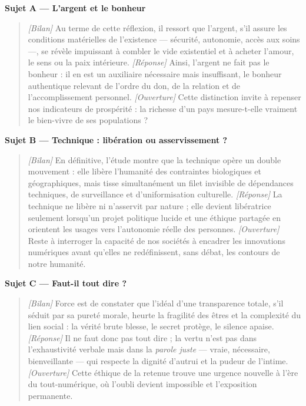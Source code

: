 \documentclass[11pt]{article}
\begin{document}
\begin{corrige}
\textbf{Sujet A — L'argent et le bonheur}
\begin{quote}
\textit{[Bilan]} Au terme de cette réflexion, il ressort que l'argent, s'il assure les conditions matérielles de l'existence — sécurité, autonomie, accès aux soins —, se révèle impuissant à combler le vide existentiel et à acheter l'amour, le sens ou la paix intérieure. \textit{[Réponse]} Ainsi, l'argent ne fait pas le bonheur : il en est un auxiliaire nécessaire mais insuffisant, le bonheur authentique relevant de l'ordre du don, de la relation et de l'accomplissement personnel. \textit{[Ouverture]} Cette distinction invite à repenser nos indicateurs de prospérité : la richesse d'un pays mesure-t-elle vraiment le bien-vivre de ses populations ?
\end{quote}

\textbf{Sujet B — Technique : libération ou asservissement ?}
\begin{quote}
\textit{[Bilan]} En définitive, l'étude montre que la technique opère un double mouvement : elle libère l'humanité des contraintes biologiques et géographiques, mais tisse simultanément un filet invisible de dépendances techniques, de surveillance et d'uniformisation culturelle. \textit{[Réponse]} La technique ne libère ni n'asservit par nature ; elle devient libératrice seulement lorsqu'un projet politique lucide et une éthique partagée en orientent les usages vers l'autonomie réelle des personnes. \textit{[Ouverture]} Reste à interroger la capacité de nos sociétés à encadrer les innovations numériques avant qu'elles ne redéfinissent, sans débat, les contours de notre humanité.
\end{quote}

\textbf{Sujet C — Faut-il tout dire ?}
\begin{quote}
\textit{[Bilan]} Force est de constater que l'idéal d'une transparence totale, s'il séduit par sa pureté morale, heurte la fragilité des êtres et la complexité du lien social : la vérité brute blesse, le secret protège, le silence apaise. \textit{[Réponse]} Il ne faut donc pas tout dire ; la vertu n'est pas dans l'exhaustivité verbale mais dans la \emph{parole juste} — vraie, nécessaire, bienveillante — qui respecte la dignité d'autrui et la pudeur de l'intime. \textit{[Ouverture]} Cette éthique de la retenue trouve une urgence nouvelle à l'ère du tout-numérique, où l'oubli devient impossible et l'exposition permanente.
\end{quote}
\end{corrige}
\end{document}
